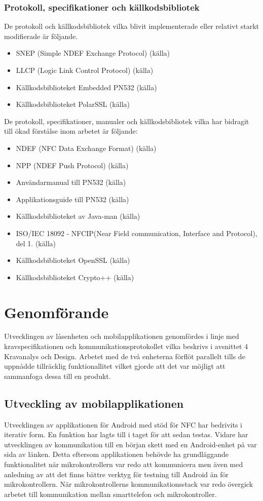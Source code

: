 \documentclass[11pt]{article}
\begin{document}
\subsubsection{Protokoll, specifikationer och källkodsbibliotek}
De protokoll och källkodsbibliotek vilka blivit implementerade eller relativt starkt modifierade är följande.
\begin{itemize}
\item SNEP (Simple NDEF Exchange Protocol) (källa)
\item LLCP (Logic Link Control Protocol) (källa)
\item Källkodsbiblioteket Embedded PN532 (källa)
\item Källkodsbiblioteket PolarSSL (källa)
\end{itemize}
De protokoll, specifikationer, manualer och källkodsbibliotek vilka har bidragit till ökad förstålse inom arbetet är följande:
\begin{itemize}
\item NDEF (NFC Data Exchange Format) (källa)
\item NPP (NDEF Push Protocol) (källa)
\item Användarmanual till PN532 (källa)
\item Applikationsguide till PN532 (källa)
\item Källkodsbiblioteket av Java-man (källa)
\item ISO/IEC 18092 - NFCIP(Near Field communication, Interface and Protocol), del 1. (källa)
\item Källkodsbiblioteket OpenSSL (källa)
\item Källkodsbiblioteket Crypto++ (källa)
\end{itemize}


\section{Genomförande}
Utvecklingen av låsenheten och mobilapplikationen genomfördes i linje med kravspecifikationen och kommunikationsprotokollet vilka beskrivs i avsnittet 4 Kravanalys och Design. Arbetet med de två enheterna förflöt parallelt tills de uppnådde tillräcklig funktionallitet vilket gjorde att det var möjligt att sammanfoga dessa till en produkt. 

\subsection{Utveckling av mobilapplikationen}
Utvecklingen av applikationen för Android med stöd för NFC har bedrivits i iterativ form. En funktion har lagts till i taget för att sedan testas. Vidare har utvecklingen av kommunikation till en början skett med en Android-enhet på var sida av länken. Detta eftersom applikationen behövde ha grundläggande funktionalitet när mikrokontrollern var redo att kommunicera men även med anledning av att det finns bättre verktyg för testning till Android än för mikrokontrollern. När mikrokontrollerns kommunikationsstack var redo övergick arbetet till kommunikation mellan smarttelefon och mikrokontroller. 
\end{document}
